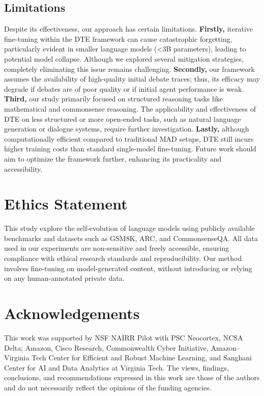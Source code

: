 \documentclass[11pt]{article}
\begin{document}
\subsection*{Limitations}
\label{section:6}
Despite its effectiveness, our approach has certain limitations. \textbf{Firstly,} iterative fine-tuning within the DTE framework can cause catastrophic forgetting, particularly evident in smaller language models (\textless3B parameters), leading to potential model collapse. Although we explored several mitigation strategies, completely eliminating this issue remains challenging. \textbf{Secondly,} our framework assumes the availability of high-quality initial debate traces; thus, its efficacy may degrade if debates are of poor quality or if initial agent performance is weak. \textbf{Third,} our study primarily focused on structured reasoning tasks like mathematical and commonsense reasoning. The applicability and effectiveness of DTE on less structured or more open-ended tasks, such as natural language generation or dialogue systems, require further investigation. \textbf{Lastly,} although computationally efficient compared to traditional MAD setups, DTE still incurs higher training costs than standard single-model fine-tuning. Future work should aim to optimize the framework further, enhancing its practicality and accessibility.



\section*{Ethics Statement}
This study explore the self-evolution of language models using publicly available benchmarks and datasets such as GSM8K, ARC, and CommonsenseQA. All data used in our experiments are non-sensitive and freely accessible, ensuring compliance with ethical research standards and reproducibility. Our method involves fine-tuning on model-generated content, without introducing or relying on any human-annotated private data. 

\section*{Acknowledgements}
This work was supported by NSF NAIRR Pilot with PSC Neocortex, NCSA Delta; Amazon, Cisco Research, Commonwealth Cyber Initiative, Amazon–Virginia Tech Center for Efficient and Robust Machine Learning, and Sanghani Center for AI and Data Analytics at Virginia Tech. The views, findings, conclusions, and recommendations expressed in this work are those of the authors and do not necessarily reflect the opinions of the funding agencies.





\appendix


\end{document}
